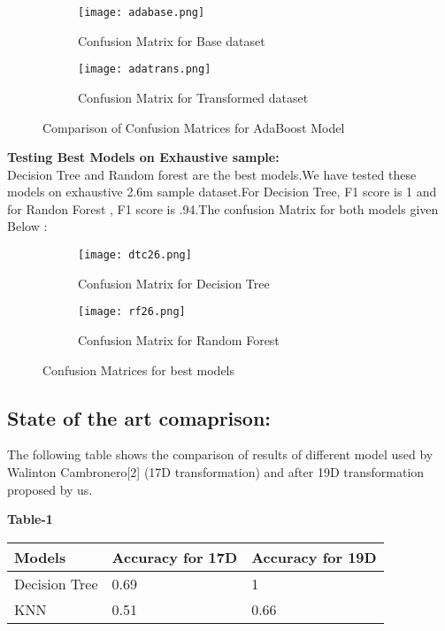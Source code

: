\documentclass[11pt, oneside]{article}   	%
\begin{document}
\begin{figure}[H]
  \begin{subfigure}[b]{0.32\textwidth}
    \centering
    \texttt{[image: adabase.png]}
    \caption{Confusion Matrix for Base dataset}
    \label{fig:confusion_matrix_base}
  \end{subfigure}
  \hfill
  \begin{subfigure}[b]{0.32\textwidth}
    \centering
    \texttt{[image: adatrans.png]}
    \caption{Confusion Matrix for Transformed dataset}
    \label{fig:confusion_matrix_transformed}
  \end{subfigure}
  \caption{Comparison of Confusion Matrices for AdaBoost Model}
  \label{fig:confusion_matrices}
\end{figure}

\textbf{Testing Best Models on Exhaustive sample:}\\
Decision Tree and Random forest are the best models.We have tested these models on exhaustive 2.6m sample dataset.For Decision Tree, F1 score is 1 and for Randon Forest , F1 score is .94.The confusion Matrix for both models given Below : 
\begin{figure}[H]
  \begin{subfigure}[b]{0.4\textwidth}
    \centering
    \texttt{[image: dtc26.png]}
    \caption{Confusion Matrix for Decision Tree}
    \label{fig:confusion_matrix_base}
  \end{subfigure}
  \hfill
  \begin{subfigure}[b]{0.4\textwidth}
    \centering
    \texttt{[image: rf26.png]}
    \caption{Confusion Matrix for Random Forest}
    \label{fig:confusion_matrix_transformed}
  \end{subfigure}
  \caption{Confusion Matrices for best models}
  \label{fig:confusion_matrices}
\end{figure}
\subsection{State of the art comaprison:}

The following table shows the comparison of results of different model used by Walinton Cambronero[2] (17D transformation) and after 19D transformation proposed by us.\\
\vspace{-5mm}
\begin{center}
    \textbf{Table-1}
\end{center}
\vspace{1mm}
\begin{tabular}{ |p{6cm}||p{4cm}|p{5cm}|  }
 \hline
 \hline
 Models& Accuracy for 17D& Accuracy for 19D\\
 \hline
 Decision Tree   & 0.69 & 1  \\
 \hline
 KNN &  0.51 & 0.66  \\
 

 \hline
\hline
\end{tabular}
\end{document}
